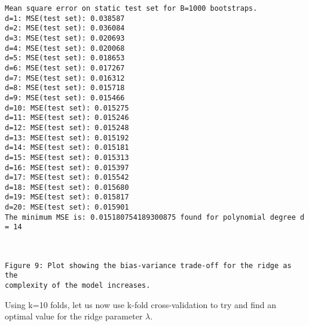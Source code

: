 \documentclass[11pt]{article}
\begin{document}
    \begin{Verbatim}[commandchars=\\\{\}]
Mean square error on static test set for B=1000 bootstraps.
d=1: MSE(test set): 0.038587
d=2: MSE(test set): 0.036084
d=3: MSE(test set): 0.020693
d=4: MSE(test set): 0.020068
d=5: MSE(test set): 0.018653
d=6: MSE(test set): 0.017267
d=7: MSE(test set): 0.016312
d=8: MSE(test set): 0.015718
d=9: MSE(test set): 0.015466
d=10: MSE(test set): 0.015275
d=11: MSE(test set): 0.015246
d=12: MSE(test set): 0.015248
d=13: MSE(test set): 0.015192
d=14: MSE(test set): 0.015181
d=15: MSE(test set): 0.015313
d=16: MSE(test set): 0.015397
d=17: MSE(test set): 0.015542
d=18: MSE(test set): 0.015680
d=19: MSE(test set): 0.015817
d=20: MSE(test set): 0.015901
The minimum MSE is: 0.015180754189300875 found for polynomial degree d = 14
    \end{Verbatim}

    \begin{center}
    \end{center}
    { \hspace*{\fill} \\}
    
    \begin{Verbatim}[commandchars=\\\{\}]
Figure 9: Plot showing the bias-variance trade-off for the ridge as the
complexity of the model increases.
    \end{Verbatim}

    Using k=10 folds, let us now use k-fold cross-validation to try and find
an optimal value for the ridge parameter \(\lambda\).
\end{document}
